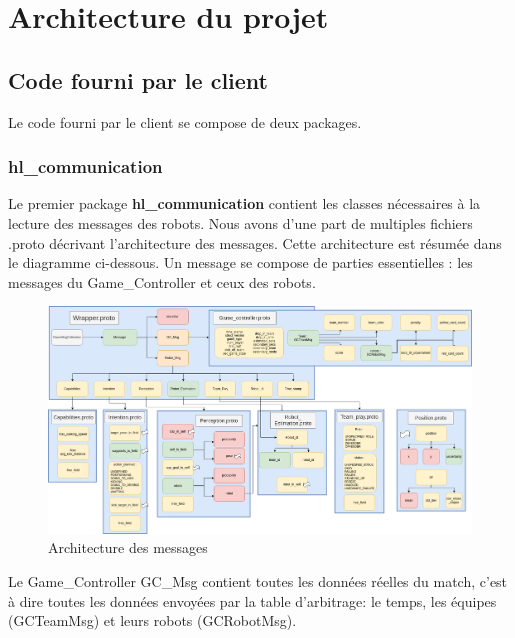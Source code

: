 
\chapter{Architecture du projet}

   
\section{Code fourni par le client}

Le code fourni par le client se compose de deux packages. 

\subsection{hl\_communication}

Le premier package \textbf{hl\_communication} contient les classes nécessaires à la lecture des messages des robots.
Nous avons d'une part de multiples fichiers .proto décrivant l'architecture des messages. Cette architecture est résumée dans le diagramme ci-dessous. Un message se compose de parties essentielles : les messages du Game\_Controller et ceux des robots.
\bigskip

\begin{figure}[h] 
\centering 
\includegraphics[scale = 0.22]{images/messages.png}
    \caption{Architecture des messages}
    \label{fig:message}
\end{figure} 


Le Game\_Controller GC\_Msg contient toutes les données réelles du match, c'est à dire toutes les données envoyées par la table d'arbitrage: le temps, les équipes (GCTeamMsg) et leurs robots (GCRobotMsg). 
\bigskip

